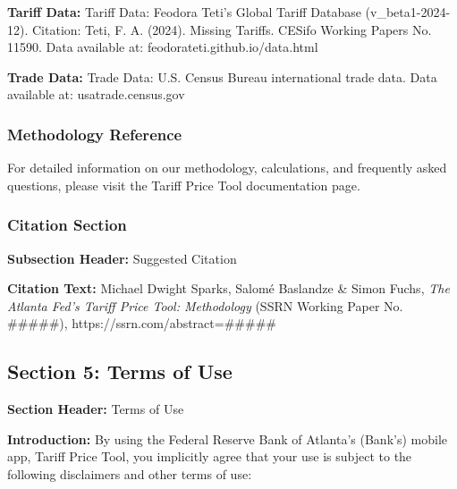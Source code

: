 \documentclass[11pt]{article}
\begin{document}
\textbf{Tariff Data:} Tariff Data: Feodora Teti's Global Tariff Database (v\_beta1-2024-12). Citation: Teti, F. A. (2024). Missing Tariffs. CESifo Working Papers No. 11590. Data available at: feodorateti.github.io/data.html

\textbf{Trade Data:} Trade Data: U.S. Census Bureau international trade data. Data available at: usatrade.census.gov

\subsubsection{Methodology Reference}
For detailed information on our methodology, calculations, and frequently asked questions, please visit the Tariff Price Tool documentation page.

\subsubsection{Citation Section}
\textbf{Subsection Header:} Suggested Citation

\textbf{Citation Text:} Michael Dwight Sparks, Salomé Baslandze \& Simon Fuchs, \textit{The Atlanta Fed's Tariff Price Tool: Methodology} (SSRN Working Paper No. \#\#\#\#\#), https://ssrn.com/abstract=\#\#\#\#\#

\subsection{Section 5: Terms of Use}
\textbf{Section Header:} Terms of Use

\textbf{Introduction:} By using the Federal Reserve Bank of Atlanta's (Bank's) mobile app, Tariff Price Tool, you implicitly agree that your use is subject to the following disclaimers and other terms of use:
\end{document}
